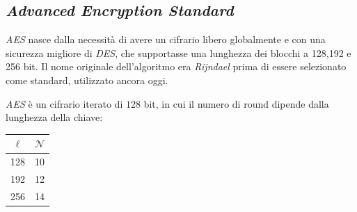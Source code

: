     


\newpage
\subsection{\textit{Advanced Encryption Standard}}
\emph{AES} nasce dalla necessità di avere un cifrario libero globalmente e con una sicurezza migliore di \emph{DES}, che supportasse una lunghezza dei blocchi a 128,192 e 256 bit. Il nome originale dell'algoritmo era \emph{Rijndael} prima di essere selezionato come standard, utilizzato ancora oggi. 

\vspace{1em}  \noindent \emph{AES} è un cifrario iterato di $128$ bit, in cui il numero di round dipende dalla lunghezza della chiave:  
    \begin{table}[h]
        \centering
        \begin{tabular}{c|c}
            $\ell$ & $\mathcal{N} $\\
            \hline
            128 & 10\\
            192 & 12\\
            256 & 14\\
        \end{tabular}
    \end{table}

